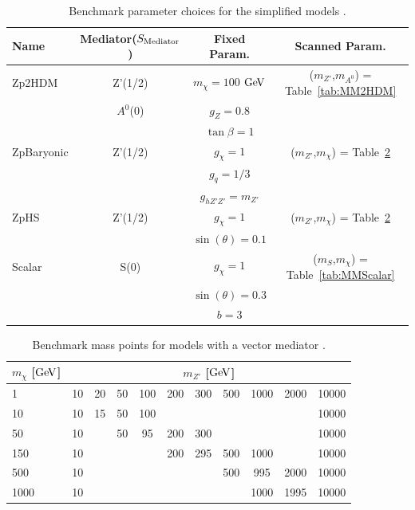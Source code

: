 \begin{table}[htbH]
\begin{tabular}{ l | c | c | c}
\hline
Name & Mediator($S_{\rm{Mediator}}$) & Fixed Param. & Scanned Param.\\
\hline
Zp2HDM & Z'(1/2) & $m_\chi = 100$ $\mathrm{Ge\kern -0.1em V}$ & ($m_{Z'}$,$m_{A^0}$) = Table~\ref{tab:MM2HDM} \\
 & $A^0$(0) & $g_Z = 0.8$ &  \\
 & & $\tan\beta = 1$ &  \\
\hline
ZpBaryonic & Z'(1/2) & $g_\chi = 1$ & ($m_{Z'}$,$m_\chi$) = Table~\ref{tab:MMVector} \\
 & & $g_q = 1/3$ &  \\
 & & $g_{hZ'Z'} = m_{Z'}$ &  \\
\hline
ZpHS & Z'(1/2) & $g_\chi = 1$ & ($m_{Z'}$,$m_\chi$) = Table~\ref{tab:MMVector} \\
 & & $\sin(\theta) = 0.1$ & \\
\hline
Scalar & S(0) & $g_\chi = 1$ & ($m_{S}$,$m_\chi$) = Table~\ref{tab:MMScalar}\\
 & & $\sin(\theta) = 0.3$ & \\
 & & $b = 3$ & \\
\hline
\end{tabular}
\caption{Benchmark parameter choices for the simplified models \cite{Carpenter:2013xra, Abercrombie:2015wmb}.}\label{tab:sms}
\end{table}

\begin{table}[htbH]
\begin{center}
\begin{tabular}{ l | c | c | c | c | c | c | c | c | c | c}
\hline
$m_\chi$ [$\mathrm{Ge\kern -0.1em V}$] & \multicolumn{10}{|c}{$m_{Z'}$ [$\mathrm{Ge\kern -0.1em V}$]} \\
\hline
1 & 10 & 20 & 50 & 100 & 200 & 300 & 500 & 1000 & 2000 & 10000 \\
10 & 10 & 15 & 50 & 100 & & & & & & 10000 \\
50 & 10 & & 50 & 95  & 200 & 300 & & & & 10000 \\
150 & 10 & & & & 200 & 295 & 500 & 1000 & & 10000 \\
500 & 10 & & & & & & 500 & 995 & 2000 & 10000 \\
1000 & 10 & & & & & & & 1000 & 1995 & 10000 \\
\hline
\end{tabular}
\caption{Benchmark mass points for models with a vector mediator \cite{Abercrombie:2015wmb}.}\label{tab:MMVector}
\end{center}
\end{table}

